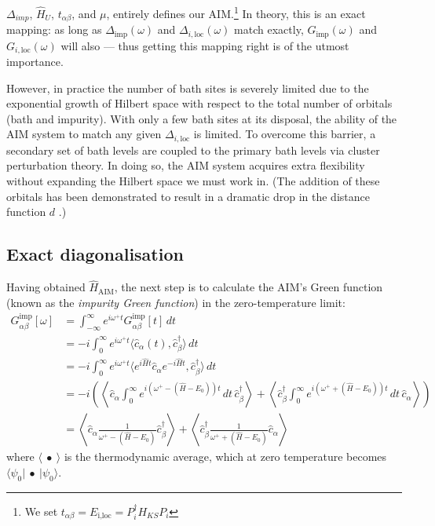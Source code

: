 \documentclass[10pt,a4paper,final]{article}
\newcommand{\bra}[1]{\langle #1|}
\newcommand{\ket}[1]{|#1\rangle}
\newcommand{\nline}{\nonumber \\}
\begin{document}
$\Delta_{imp}$, $\hat H_U$, $t_{\alpha\beta}$, and $\mu$, entirely defines our AIM.\footnote{We set $t_{\alpha\beta} = E_\text{i,loc} = P_i^\dag H_{KS} P_i$} In theory, this is an exact mapping: as long as $\Delta_\text{imp}(\omega)$ and $\Delta_{i,\text{loc}}(\omega)$ match exactly, $G_\text{imp}(\omega)$ and $G_{i,\text{loc}}(\omega)$ will also --- thus getting this mapping right is of the utmost importance.%

However, in practice the number of bath sites is severely limited due to the exponential growth of Hilbert space with respect to the total number of orbitals (bath and impurity). With only a few bath sites at its disposal, the ability of the AIM system to match any given $\Delta_{i,\text{loc}}$ is limited. To overcome this barrier, a secondary set of bath levels are coupled to the primary bath levels via cluster perturbation theory. In doing so, the AIM system acquires extra flexibility without expanding the Hilbert space we must work in. (The addition of these orbitals has been demonstrated to result in a dramatic drop in the distance function $d$ \cite{Weber2012a}.)

\subsection{Exact diagonalisation}
Having obtained $\hat H_\text{AIM}$, the next step is to calculate the AIM's Green function (known as the \emph{impurity Green function}) in the zero-temperature limit:
%
\begin{align}
G^\text{imp}_{\alpha\beta}[\omega]
&= \int_{-\infty}^\infty e^{i\omega^+t} G^\text{imp}_{\alpha\beta}[t] \, dt \nline
&= - i \int_{0}^\infty e^{i\omega^+t} \langle {\hat c_\alpha(t), \hat c^\dag_\beta} \rangle \, dt \nline
&= - i \int_{0}^\infty e^{i\omega^+t} \langle {e^{i\hat H t} \hat c_\alpha e^{-i\hat H t}, \hat c^\dag_\beta} \rangle \, dt \nline
&= - i \left(
    \left\langle \hat c_\alpha \int_{0}^\infty e^{i(\omega^+-(\hat H - E_0))t} \, dt \, \hat c^\dag_\beta \right\rangle
  + \left\langle \hat c^\dag_\beta \int_{0}^\infty e^{i(\omega^++(\hat H - E_0))t} \, dt \, \hat c_\alpha \right\rangle
\right)\nline
&= \left\langle \hat c_\alpha \frac{1}{\omega^+-(\hat H - E_0)} \hat c^\dag_\beta \right\rangle
  + \left\langle \hat c^\dag_\beta \frac{1}{\omega^++(\hat H - E_0)} \hat c_\alpha \right\rangle 
\label{eqn:DMFT_Lanzcos_Gimp}
\end{align}
%
where $\langle~\bullet~\rangle$ is the thermodynamic average, which at zero temperature becomes $\bra{\psi_0}~\bullet~\ket{\psi_0}$.
\end{document}
